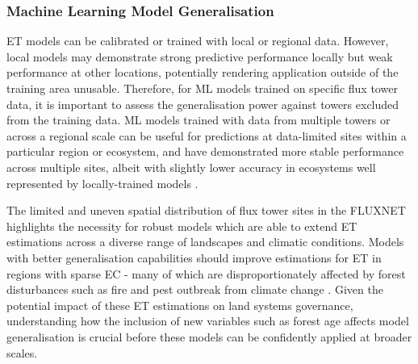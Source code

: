 
\subsubsection{Machine Learning Model Generalisation}
ET models can be calibrated or trained with local or regional data. However, local models may demonstrate strong predictive performance locally but weak performance at other locations, potentially rendering application outside of the training area unusable. Therefore, for ML models trained on specific flux tower data, it is important to assess the generalisation power against towers excluded from the training data. ML models trained with data from multiple towers or across a regional scale can be useful for predictions at data-limited sites within a particular region or ecosystem, and have demonstrated more stable performance across multiple sites, albeit with slightly lower accuracy in ecosystems well represented by locally-trained models \parencite{ferreira2021generalizability}.
\par The limited and uneven spatial distribution of flux tower sites in the FLUXNET highlights the necessity for robust models which are able to extend ET estimations across a diverse range of landscapes and climatic conditions. Models with better generalisation capabilities should improve estimations for ET in regions with sparse EC - many of which are disproportionately affected by forest disturbances such as fire and pest outbreak from climate change \parencite{altman2024global,shi2024machine}. Given the potential impact of these ET estimations on land systems governance, understanding how the inclusion of new variables such as forest age affects model generalisation is crucial before these models can be confidently applied at broader scales.

